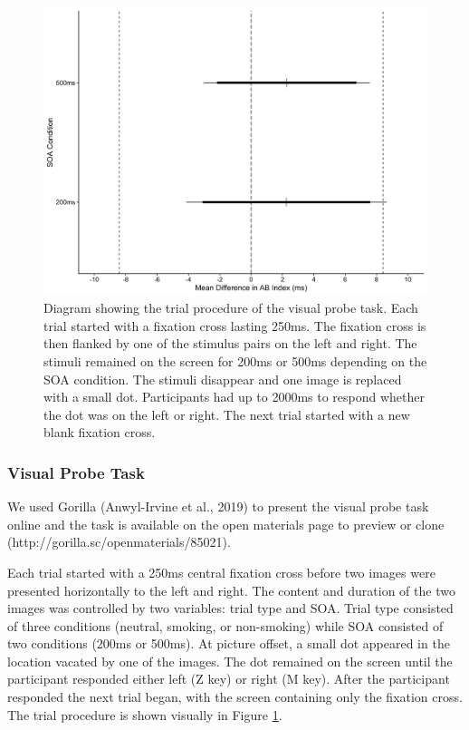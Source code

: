\documentclass[empirical, authordate]{jote-new-article}
\begin{document}
\begin{figure}

  \begin{fullwidth}
    \includegraphics[width=\linewidth]{media/image1.jpeg}
    \caption{Diagram showing the trial procedure of the visual probe task. Each trial started with a fixation cross lasting 250ms. The fixation cross is then flanked by one of the stimulus pairs on the left and right. The stimuli remained on the screen for 200ms or 500ms depending on the SOA condition. The stimuli disappear and one image is replaced with a small dot. Participants had up to 2000ms to respond whether the dot was on the left or right. The next trial started with a new blank fixation cross.
    }

    \label{fig:1}
  \end{fullwidth}


\end{figure}

\subsubsection{Visual Probe Task}

We used Gorilla (Anwyl-Irvine et al., 2019) to present the visual probe task online and the task is available on the open materials page to preview or clone (http://gorilla.sc/openmaterials/85021).

Each trial started with a 250ms central fixation cross before two images were presented horizontally to the left and right. The content and duration of the two images was controlled by two variables: trial type and SOA. Trial type consisted of three conditions (neutral, smoking, or non-smoking) while SOA consisted of two conditions (200ms or 500ms). At picture offset, a small dot appeared in the location vacated by one of the images. The dot remained on the screen until the participant responded either left (Z key) or right (M key). After the participant responded the next trial began, with the screen containing only the fixation cross. The trial procedure is shown visually in Figure \ref{fig:1}.
\end{document}
